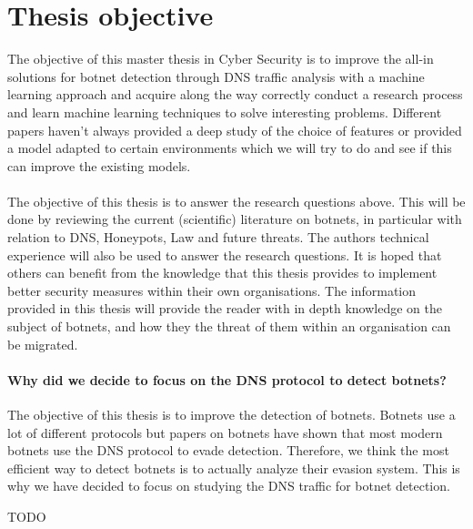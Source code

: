\section{Thesis objective}
The objective of this master thesis in Cyber Security is to improve the all-in solutions for botnet detection through DNS traffic analysis with a machine learning approach and acquire along the way correctly conduct a research process and learn machine learning techniques to solve interesting problems. Different papers haven't always provided a deep study of the choice of features or provided a model adapted to certain environments which we will try to do and see if this can improve the existing models.\\
\\
\cite{bot-org}
The objective of this thesis is to answer the research questions above. This will be done by reviewing the current (scientific) literature on botnets, in particular with relation to DNS, Honeypots, Law and future threats. The authors technical experience will also be used to answer the research questions. It is hoped that others can benefit from the knowledge that this thesis provides to implement
better security measures within their own organisations. The information provided in this thesis will provide the reader with in depth knowledge on the subject of botnets, and how they the threat of them within an organisation can be migrated.
\\

\paragraph{Why did we decide to focus on the DNS protocol to detect botnets?}
The objective of this thesis is to improve the detection of botnets. Botnets use a lot of different protocols but papers on botnets have shown that most modern botnets use the DNS protocol to evade detection. Therefore, we think the most efficient way to detect botnets is to actually analyze their evasion system. This is why we have decided to focus on studying the DNS traffic for botnet detection.

TODO

